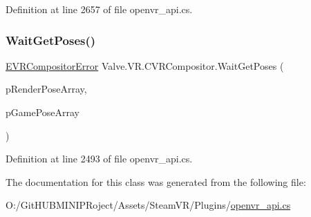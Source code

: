 Definition at line 2657 of file openvr\+\_\+api.\+cs.

\mbox{\label{class_valve_1_1_v_r_1_1_c_v_r_compositor_a4c8b57832b7579ed1485d6b1282bfc18}} 
\subsubsection{\texorpdfstring{WaitGetPoses()}{WaitGetPoses()}}
{\footnotesize\ttfamily \mbox{\hyperlink{namespace_valve_1_1_v_r_ac34ee1034fda668ccd45f57676ded81b}{E\+V\+R\+Compositor\+Error}} Valve.\+V\+R.\+C\+V\+R\+Compositor.\+Wait\+Get\+Poses (\begin{DoxyParamCaption}\item[{\mbox{\hyperlink{struct_valve_1_1_v_r_1_1_tracked_device_pose__t}{Tracked\+Device\+Pose\+\_\+t}} \mbox{[}$\,$\mbox{]}}]{p\+Render\+Pose\+Array,  }\item[{\mbox{\hyperlink{struct_valve_1_1_v_r_1_1_tracked_device_pose__t}{Tracked\+Device\+Pose\+\_\+t}} \mbox{[}$\,$\mbox{]}}]{p\+Game\+Pose\+Array }\end{DoxyParamCaption})}



Definition at line 2493 of file openvr\+\_\+api.\+cs.



The documentation for this class was generated from the following file\+:\begin{DoxyCompactItemize}
\item 
O\+:/\+Git\+H\+U\+B\+M\+I\+N\+I\+P\+Roject/\+Assets/\+Steam\+V\+R/\+Plugins/\mbox{\hyperlink{openvr__api_8cs}{openvr\+\_\+api.\+cs}}\end{DoxyCompactItemize}
